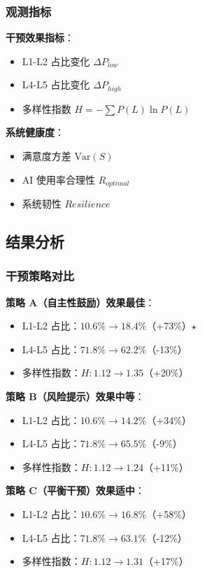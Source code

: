 \documentclass[a4paper,12pt]{article}
\begin{document}
\subsubsection{观测指标}

\textbf{干预效果指标}：
\begin{itemize}
    \item L1-L2 占比变化 $\Delta P_{low}$
    \item L4-L5 占比变化 $\Delta P_{high}$
    \item 多样性指数 $H = -\sum P(L) \ln P(L)$
\end{itemize}

\textbf{系统健康度}：
\begin{itemize}
    \item 满意度方差 $\text{Var}(S)$
    \item AI 使用率合理性 $R_{optimal}$
    \item 系统韧性 $Resilience$
\end{itemize}

\subsection{结果分析}

\subsubsection{干预策略对比}

\textbf{策略 A（自主性鼓励）效果最佳}：
\begin{itemize}
    \item L1-L2 占比：$10.6\% \rightarrow 18.4\%$（+73\%）$\star$
    \item L4-L5 占比：$71.8\% \rightarrow 62.2\%$（-13\%）
    \item 多样性指数：$H: 1.12 \rightarrow 1.35$（+20\%）
\end{itemize}

\textbf{策略 B（风险提示）效果中等}：
\begin{itemize}
    \item L1-L2 占比：$10.6\% \rightarrow 14.2\%$（+34\%）
    \item L4-L5 占比：$71.8\% \rightarrow 65.5\%$（-9\%）
    \item 多样性指数：$H: 1.12 \rightarrow 1.24$（+11\%）
\end{itemize}

\textbf{策略 C（平衡干预）效果适中}：
\begin{itemize}
    \item L1-L2 占比：$10.6\% \rightarrow 16.8\%$（+58\%）
    \item L4-L5 占比：$71.8\% \rightarrow 63.1\%$（-12\%）
    \item 多样性指数：$H: 1.12 \rightarrow 1.31$（+17\%）
\end{itemize}
\end{document}
